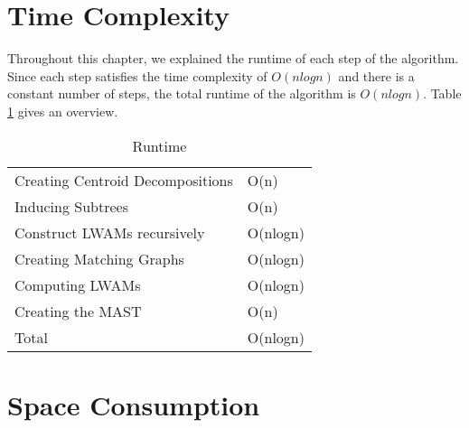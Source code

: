 \section{Time Complexity}
Throughout this chapter, we explained the runtime of each step of the algorithm. Since each step satisfies the time complexity of $O(nlogn)$ and there is a constant number of steps, the total runtime of the algorithm is $O(nlogn)$. Table \ref{runtimeTable} gives an overview.
\begin{table}[]
	\centering
	\begin{tabular}{l|l}
		Creating Centroid Decompositions & O(n)     \\
		Inducing Subtrees                & O(n)     \\
		Construct LWAMs recursively		 & O(nlogn) \\
		Creating Matching Graphs         & O(nlogn) \\
		Computing LWAMs                  & O(nlogn) \\
		Creating the MAST                & O(n)     \\ \hline
		Total                            & O(nlogn)
	\end{tabular}
	\caption{Runtime}
	\label{runtimeTable}
\end{table}

\section{Space Consumption}











